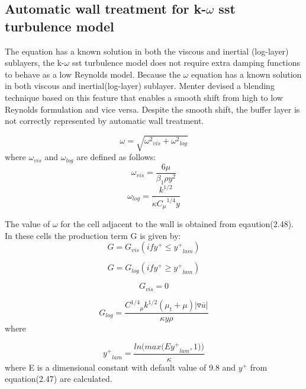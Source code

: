\subsection{Automatic wall treatment for k-$\omega$ sst turbulence model}
The equation has a known solution in both the viscous and inertial
(log-layer) sublayers, the k-$\omega$ sst turbulence model does not
require extra damping functions to behave as a low Reynolds model.
Because the $\omega$ equation has a known solution in both viscous and
inertial(log-layer) sublayer. Menter devised a blending technique
based on this feature that enables a smooth shift from high to low
Reynolds formulation and vice versa.  Despite the smooth shift, the
buffer layer is not correctly represented by automatic wall treatment.

\begin{equation}
{\omega}={\sqrt{{{{{\omega}^2}_{vis}}}+{{{{\omega}^2}_{log}}}}}
\end{equation}
where ${\omega}_{vis}$ and ${\omega}_{log}$ are defined as follows:
\begin{equation}
{{\omega}_{vis}}={\frac{6\mu}{{{\beta}_1}{\rho}{y^2}}}
\end{equation}
\begin{equation}
{{\omega}_{log}}={\frac{{k}^{1/2}}{\kappa {{C_{\mu}}^{1/4}} y}}
\end{equation}

The value of $\omega$ for the cell adjacent to the wall is obtained
from eqaution(2.48). In these cells the production term G is given by:
\begin{equation}
G={G_{vis}}   (if {y^+}\le{{{y}^+}_{lam}})
\end{equation}

\begin{equation}
G={{G}_{log}} (if {{y^+}}\ge{{{y}^+}_{lam}})
\end{equation}

\begin{equation}
{G_{vis}}=0
\end{equation}

\begin{equation}
{G_{log}}={\frac{{{C}^{1/4}}_{\mu}
    {{k}^{1/2}}({{\mu}_t}+{\mu})\vert{{\triangledown
        \overline{u}}}\vert}{\kappa y {\rho}}}
\end{equation}
where

\begin{equation}
{{y^+}_{lam}}={\frac{{ln\bigg(max\bigg(E{{y^+}_{lam}},1\bigg)\bigg)}}{\kappa}}
\end{equation}
where E is a dimensional constant with default value of 9.8 and
${y}^+$ from equation(2.47) are calculated.
